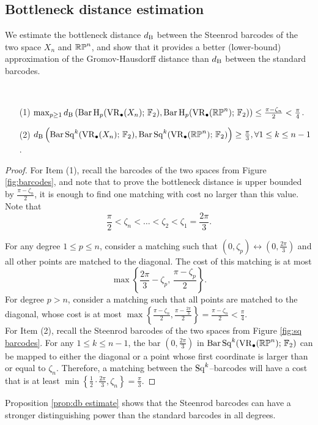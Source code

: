 \subsection{Bottleneck distance estimation}

We estimate the bottleneck distance $d_{\mathrm{B}}$ between the Steenrod barcodes of the two space $X_n$ and $\mathbb{RP}^n$, and show that it provides a better (lower-bound) approximation of the Gromov-Hausdorff distance than $d_{\mathrm{B}}$ between the standard barcodes.

\begin{theorem}\label{prop:db estimate}
	\ \par
	\begin{itemize}
		\item[(1)] $\max_{p\geq 1}d_{\mathrm{B}}\left(\operatorname{Bar} \operatorname{H}_{p}(\operatorname{VR}_\bullet(X_n);\,{\mathbb{F}_2}), \operatorname{Bar} \operatorname{H}_{p}(\operatorname{VR}_\bullet(\mathbb{RP}^n);\,{\mathbb{F}_2})\right)\leq \frac{\pi-\zeta_n}{2}<\frac{\pi}{4}$.
		\smallskip\item[(2)] $d_{\mathrm{B}}\left(\operatorname{Bar}\operatorname{Sq}^{k}(\operatorname{VR}_\bullet(X_n);\,{\mathbb{F}_2}), \operatorname{Bar}\operatorname{Sq}^{k}(\operatorname{VR}_\bullet(\mathbb{RP}^n);\,{\mathbb{F}_2})\right)\geq \frac{\pi}{3},\forall 1\leq k\leq n-1$.
	\end{itemize}
\end{theorem}

\begin{proof}
	For Item (1), recall the barcodes of the two spaces from Figure \ref{fig:barcodes}, and note that to prove the bottleneck distance is upper bounded by $\frac{\pi-\zeta_n}{2}$, it is enough to find one matching with cost no larger than this value. Note that
	\[\frac{\pi}{2}<\zeta_n<\dots<\zeta_2<\zeta_1 =\frac{2\pi}{3}.\]

	For any degree $1\leq p\leq n$, consider a matching such that $(0,\zeta_p)\leftrightarrow \left(0,\frac{2\pi}{3}\right)$ and all other points are matched to the diagonal. The cost of this matching is at most
	\[\max\left\{\frac{2\pi}{3}-\zeta_p,\,\frac{\pi-\zeta_p}{2}\right\}.\]
	For degree $p>n$, consider a matching such that all points are matched to the diagonal, whose cost is at most $\max\left\{ \frac{\pi-\zeta_n}{2}, \frac{\pi-\frac{2\pi}{3}}{2}\right\} = \frac{\pi-\zeta_n}{2}<\frac{\pi}{4}.$ \\

	For Item (2), recall the Steenrod barcodes of the two spaces from Figure \ref{fig:sq barcodes}. For any $1\leq k\leq n-1$, the bar $\left(0,\frac{2\pi}{3}\right)$ in $\operatorname{Bar}\operatorname{Sq}^{k}(\operatorname{VR}_\bullet(\mathbb{RP}^n);\,{\mathbb{F}_2})$ can be mapped to either the diagonal or a point whose first coordinate is larger than or equal to $\zeta_n$. Therefore, a matching between the $\operatorname{Sq}^k$--barcodes will have a cost that is at least $\min\left\{\frac{1}{2}\cdot\frac{2\pi}{3}, \zeta_n\right\} = \frac{\pi}{3}.$
\end{proof}

Proposition \ref{prop:db estimate} shows that the Steenrod barcodes can have a stronger distinguishing power than the standard barcodes in all degrees.
